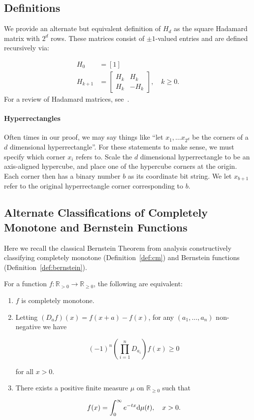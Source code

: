 \subsection{Definitions}\label{sec:preli:definition}
We provide an alternate but equivalent definition of $H_d$ as the square Hadamard matrix with $2^d$ rows. These matrices consist of $\pm 1$-valued entries and are defined recursively via:

\begin{align*}
H_0&=[1]\\
H_{k+1}&=\begin{bmatrix}H_k&H_k\\ H_k& -H_k\end{bmatrix}, \quad k\geq 0.
\end{align*}
 For a review of Hadamard matrices, see~\cite{hadamard}.
 
 
\paragraph{Hyperrectangles} Often times in our proof, we may say things like ``let $x_1, \ldots
x_{2^d}$ be the corners of a $d$ dimensional hyperrectangle''. For these statements
to make sense, we must specify which corner $x_i$ refers
to. Scale the $d$ dimensional hyperrectangle to be an axis-aligned hypercube, and place
one of the hypercube corners at the origin. Each corner then has a binary number $b$ as its coordinate bit string. We let $x_{b+1}$ refer to the original hyperrectangle
corner corresponding to $b$.


\subsection{Alternate Classifications of Completely Monotone and Bernstein Functions}\label{sec:preli:classification}

Here we recall the classical Bernstein Theorem from analysis constructively classifying completely monotone (Definition~\ref{def:cm}) and Bernstein functions (Definition~\ref{def:bernstein}).
\begin{prop}\label{prop:cm}

For a function $f:\mathbb R_{> 0}\to\mathbb R_{\geq 0}$, the following are equivalent:

\begin{enumerate}
  \item $f$ is completely monotone.
  \item Letting $(D_af)(x)=f(x+a)-f(x)$, for any $(a_1,\dots,a_n)$ non-negative we have 

  \[(-1)^n \left(\prod_{i=1}^n D_{a_i}\right)f(x)\geq 0\]

  for all $x>0$.
  \item There exists a positive finite measure $\mu$ on $\mathbb R_{\geq 0}$ such that 

  \[f(x)=\int_0^{\infty} e^{-tx}\mathrm{d} \mu(t),\quad x>0.\]
\end{enumerate}

\end{prop}

